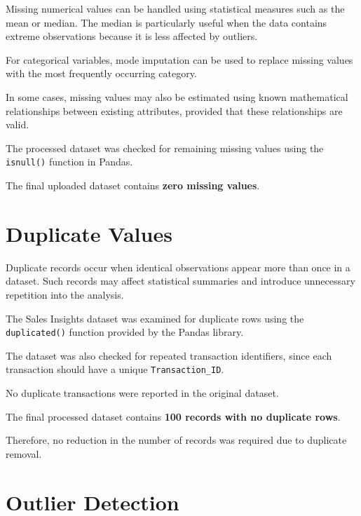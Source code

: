 \documentclass[12pt,a4paper]{report}
\begin{document}
Missing numerical values can be handled
using statistical measures such as the
mean or median. The median is particularly
useful when the data contains extreme
observations because it is less affected
by outliers.

For categorical variables, mode imputation
can be used to replace missing values with
the most frequently occurring category.

In some cases, missing values may also
be estimated using known mathematical
relationships between existing attributes,
provided that these relationships are valid.

The processed dataset was checked for
remaining missing values using the
\texttt{isnull()} function in Pandas.

The final uploaded dataset contains
\textbf{zero missing values}.


\section{Duplicate Values}

Duplicate records occur when identical
observations appear more than once in
a dataset. Such records may affect
statistical summaries and introduce
unnecessary repetition into the analysis.

The Sales Insights dataset was examined
for duplicate rows using the
\texttt{duplicated()} function provided
by the Pandas library.

The dataset was also checked for
repeated transaction identifiers,
since each transaction should have
a unique \texttt{Transaction\_ID}.

No duplicate transactions were reported
in the original dataset.

The final processed dataset contains
\textbf{100 records with no duplicate rows}.

Therefore, no reduction in the number
of records was required due to
duplicate removal.


\section{Outlier Detection}


\begingroup
\fontsize{14}{21}\selectfont
\end{document}
